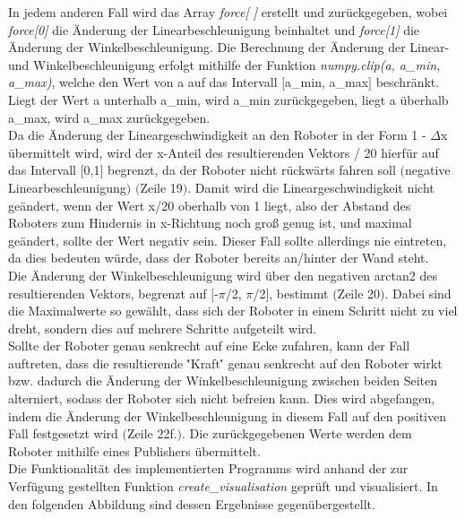 \documentclass[12pt, a4paper]{report}
\begin{document}
In jedem anderen Fall wird das Array \textit{force[ ]} erstellt und zurückgegeben, wobei \textit{force[0]} die Änderung der Linearbeschleunigung beinhaltet und \textit{force[1]} die Änderung der Winkelbeschleunigung. Die Berechnung der Änderung der Linear- und Winkelbeschleunigung erfolgt mithilfe der Funktion \textit{numpy.clip(a, a\_min, a\_max)}, welche den Wert von a auf das Intervall $[$a\_min, a\_max$]$ beschränkt. Liegt der Wert a unterhalb a\_min, wird a\_min zurückgegeben, liegt a überhalb a\_max, wird a\_max zurückgegeben. \\
Da die Änderung der Lineargeschwindigkeit an den Roboter in der Form 1 - $\Delta$x übermittelt wird, wird der x-Anteil des resultierenden Vektors / 20 hierfür auf das Intervall $[$0,1$]$ begrenzt, da der Roboter nicht rückwärts fahren soll $($negative Linearbeschleunigung$)$ $($Zeile 19$)$. Damit wird die Lineargeschwindigkeit nicht geändert, wenn der Wert x/20 oberhalb von 1 liegt, also der Abstand des Roboters zum Hindernis in x-Richtung noch groß genug ist, und maximal geändert, sollte der Wert negativ sein. Dieser Fall sollte allerdings nie eintreten, da dies bedeuten würde, dass der Roboter bereits an/hinter der Wand steht.\\
Die Änderung der Winkelbeschleunigung wird über den negativen arctan2 des resultierenden Vektors, begrenzt auf $[$-$\pi$/2, $\pi$/2$]$, bestimmt $($Zeile 20$)$. Dabei sind die Maximalwerte so gewählt, dass sich der Roboter in einem Schritt nicht zu viel dreht, sondern dies auf mehrere Schritte aufgeteilt wird.\\
Sollte der Roboter genau senkrecht auf eine Ecke zufahren, kann der Fall auftreten, dass die resultierende \''Kraft\'' genau senkrecht auf den Roboter wirkt bzw. dadurch die Änderung der Winkelbeschleunigung zwischen beiden Seiten alterniert, sodass der Roboter sich nicht befreien kann. Dies wird abgefangen, indem die Änderung der Winkelbeschleunigung in diesem Fall auf den positiven Fall festgesetzt wird $($Zeile  22f.$)$.
Die zurückgegebenen Werte werden dem Roboter mithilfe eines Publishers übermittelt.\\


Die Funktionalität des implementierten Programms wird anhand der zur Verfügung gestellten Funktion \textit{create\_visualisation} geprüft und visualisiert. In den folgenden Abbildung sind dessen Ergebnisse gegenübergestellt.\newpage
\end{document}

